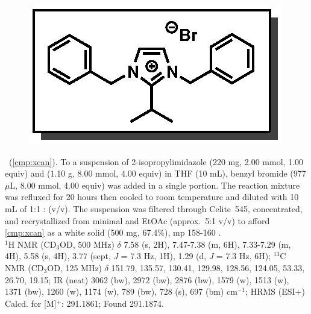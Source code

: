 \vspace{10pt}
\begin{figure}
  \vspace{-30pt}
  \begin{center}
    \includegraphics[scale=0.8]{chp_alkylation/images/xcan}
  \end{center}
  \vspace{-35pt}
\end{figure}
\noindent \textbf{\CMPxcan}\ (\ref{cmp:xcan}). To a suspension of 2-isopropylimidazole (220 mg,
2.00 mmol, 1.00 equiv) and  (1.10 g, 8.00 mmol, 4.00 equiv) in THF (10 mL), benzyl
bromide (977 $\mu$L, 8.00 mmol, 4.00 equiv) was added in a single portion. The reaction mixture
was refluxed for 20 hours then cooled to room temperature and diluted with 10 mL of 1:1 :
  (v/v). The suspension was filtered through Celite\regtm~545, concentrated, and
recrystallized from minimal  and EtOAc (approx.~5:1 v/v) to afford \ref{cmp:xcan} as a
white solid (500 mg, 67.4\%), mp 158-160 \degc.\\
$^1$H NMR (CD$_3$OD, 500 MHz) $\delta$ 7.58 (s, 2H), 7.47-7.38 (m, 6H), 7.33-7.29 (m, 4H), 5.58 (s,
4H), 3.77 (sept, \textit{J} = 7.3 Hz, 1H), 1.29 (d, \textit{J} = 7.3 Hz, 6H); $^{13}$C NMR
(CD$_3$OD, 125 MHz) $\delta$ 151.79, 135.57, 130.41, 129.98, 128.56, 124.05, 53.33, 26.70, 19.15; IR (neat)  3062 (bw), 2972 (bw), 2876 (bw), 1579 (w), 1513 (w), 1371 (bw), 1260 (w),
1174 (w), 789 (bw), 728 (s), 697 (bm) cm$^{-1}$; HRMS (ESI+) Calcd. for  [M]$^+$: 291.1861;
Found 291.1874.

